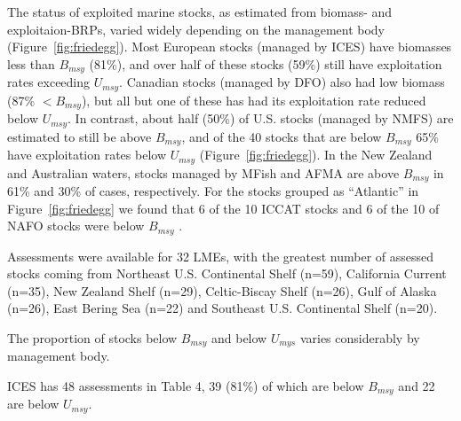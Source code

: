 The status of exploited marine stocks, as estimated from biomass- and
exploitaion-BRPs, varied widely depending on the management body
(Figure~\ref{fig:friedegg}). Most European stocks (managed by
ICES) have biomasses less than $B_{msy}$
(81\%), and over half of these
stocks (59\%) still
have exploitation rates exceeding $U_{msy}$. Canadian stocks (managed
by DFO) also had low biomass (87\%
$< B_{msy}$), but all but one of these has had its exploitation rate
reduced below $U_{msy}$. In contrast, about half
(50\%) of U.S. stocks (managed by
NMFS) are estimated to still be above $B_{msy}$, and of the
40 stocks that are below $B_{msy}$
65\% have exploitation
rates below $U_{msy}$ (Figure~\ref{fig:friedegg}). In the New
Zealand and Australian waters, stocks managed by MFish and AFMA are
above $B_{msy}$ in 61\% and
30\% of cases, respectively. For
the stocks grouped as ``Atlantic'' in Figure~\ref{fig:friedegg} we
found that 6 of the
10 ICCAT stocks and
6 of the
10 of NAFO stocks were below $B_{msy}$ .



Assessments were available for 32 LMEs, with the greatest number of
assessed stocks coming from Northeast U.S. Continental Shelf (n=59),
California Current (n=35), New Zealand Shelf (n=29),
Celtic-Biscay Shelf (n=26), Gulf of Alaska (n=26), East Bering Sea (n=22)
and Southeast U.S. Continental Shelf (n=20).

The proportion of stocks below $B_{msy}$ and below $U_{mys}$ varies considerably by management body. 

ICES has 48 assessments in Table 4,
39
(81\%) of which are below
$B_{msy}$ and 22 are below
$U_{msy}$.
